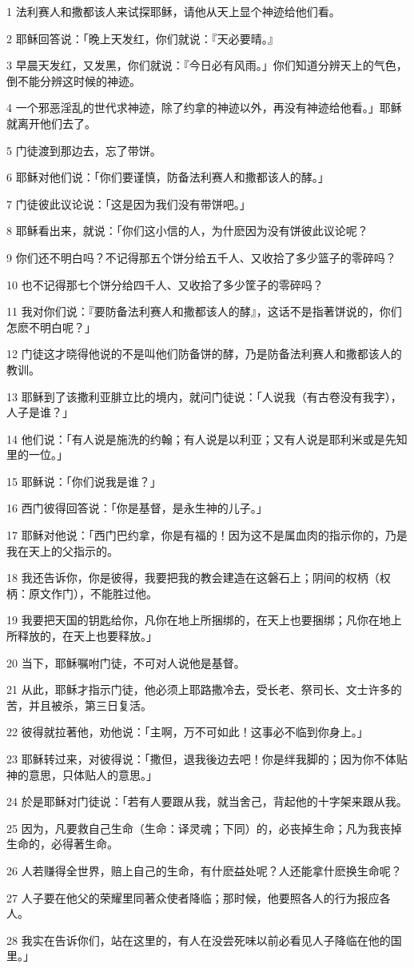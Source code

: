 \par 1 法利赛人和撒都该人来试探耶稣，请他从天上显个神迹给他们看。
\par 2 耶稣回答说：「晚上天发红，你们就说：『天必要晴。』
\par 3 早晨天发红，又发黑，你们就说：『今日必有风雨。」你们知道分辨天上的气色，倒不能分辨这时候的神迹。
\par 4 一个邪恶淫乱的世代求神迹，除了约拿的神迹以外，再没有神迹给他看。」耶稣就离开他们去了。
\par 5 门徒渡到那边去，忘了带饼。
\par 6 耶稣对他们说：「你们要谨慎，防备法利赛人和撒都该人的酵。」
\par 7 门徒彼此议论说：「这是因为我们没有带饼吧。」
\par 8 耶稣看出来，就说：「你们这小信的人，为什麽因为没有饼彼此议论呢？
\par 9 你们还不明白吗？不记得那五个饼分给五千人、又收拾了多少篮子的零碎吗？
\par 10 也不记得那七个饼分给四千人、又收拾了多少筐子的零碎吗？
\par 11 我对你们说：『要防备法利赛人和撒都该人的酵』，这话不是指著饼说的，你们怎麽不明白呢？」
\par 12 门徒这才晓得他说的不是叫他们防备饼的酵，乃是防备法利赛人和撒都该人的教训。
\par 13 耶稣到了该撒利亚腓立比的境内，就问门徒说：「人说我（有古卷没有我字），人子是谁？」
\par 14 他们说：「有人说是施洗的约翰；有人说是以利亚；又有人说是耶利米或是先知里的一位。」
\par 15 耶稣说：「你们说我是谁？」
\par 16 西门彼得回答说：「你是基督，是永生神的儿子。」
\par 17 耶稣对他说：「西门巴约拿，你是有福的！因为这不是属血肉的指示你的，乃是我在天上的父指示的。
\par 18 我还告诉你，你是彼得，我要把我的教会建造在这磐石上；阴间的权柄（权柄：原文作门），不能胜过他。
\par 19 我要把天国的钥匙给你，凡你在地上所捆绑的，在天上也要捆绑；凡你在地上所释放的，在天上也要释放。」
\par 20 当下，耶稣嘱咐门徒，不可对人说他是基督。
\par 21 从此，耶稣才指示门徒，他必须上耶路撒冷去，受长老、祭司长、文士许多的苦，并且被杀，第三日复活。
\par 22 彼得就拉著他，劝他说：「主啊，万不可如此！这事必不临到你身上。」
\par 23 耶稣转过来，对彼得说：「撒但，退我後边去吧！你是绊我脚的；因为你不体贴神的意思，只体贴人的意思。」
\par 24 於是耶稣对门徒说：「若有人要跟从我，就当舍己，背起他的十字架来跟从我。
\par 25 因为，凡要救自己生命（生命：译灵魂；下同）的，必丧掉生命；凡为我丧掉生命的，必得著生命。
\par 26 人若赚得全世界，赔上自己的生命，有什麽益处呢？人还能拿什麽换生命呢？
\par 27 人子要在他父的荣耀里同著众使者降临；那时候，他要照各人的行为报应各人。
\par 28 我实在告诉你们，站在这里的，有人在没尝死味以前必看见人子降临在他的国里。」

